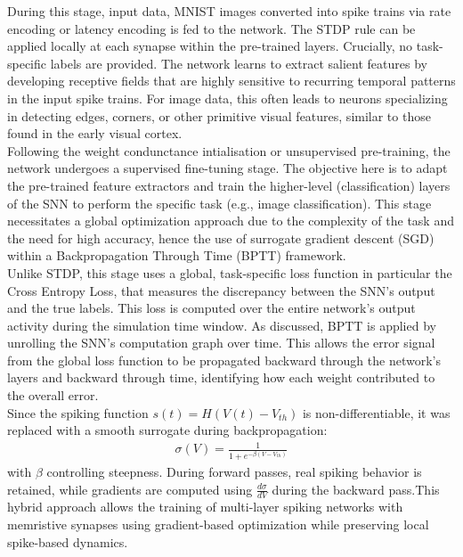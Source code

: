 \noindent During this stage, input data, MNIST images converted into spike trains via rate encoding or latency encoding is fed to the network. The STDP rule can be applied locally at each synapse within the pre-trained layers. Crucially, no task-specific labels are provided. The network learns to extract salient features by developing receptive fields that are highly sensitive to recurring temporal patterns in the input spike trains. For image data, this often leads to neurons specializing in detecting edges, corners, or other primitive visual features, similar to those found in the early visual cortex.\\

\noindent Following the weight condunctance intialisation or unsupervised pre-training, the network undergoes a supervised fine-tuning stage. The objective here is to adapt the pre-trained feature extractors and train the higher-level (classification) layers of the SNN to perform the specific task (e.g., image classification). This stage necessitates a global optimization approach due to the complexity of the task and the need for high accuracy, hence the use of surrogate gradient descent (SGD) within a Backpropagation Through Time (BPTT) framework.\\

\noindent Unlike STDP, this stage uses a global, task-specific loss function in particular the Cross Entropy Loss, that measures the discrepancy between the SNN's output and the true labels. This loss is computed over the entire network's output activity during the simulation time window. As discussed, BPTT is applied by unrolling the SNN's computation graph over time. This allows the error signal from the global loss function to be propagated backward through the network's layers and backward through time, identifying how each weight contributed to the overall error.\\ 

\noindent Since the spiking function $s(t) = H(V(t) - V_{th})$ is non-differentiable, it was replaced with a smooth surrogate during backpropagation:
\begin{align}
    \sigma(V) = \frac{1}{1 + e^{-\beta(V - V_{th})}} \label{eq:6.41}
\end{align}
with $\beta$ controlling steepness. During forward passes, real spiking behavior is retained, while gradients are computed using $\frac{d\sigma}{dV}$ during the backward pass.This hybrid approach allows the training of multi-layer spiking networks with memristive synapses using gradient-based optimization while preserving local spike-based dynamics.\\

